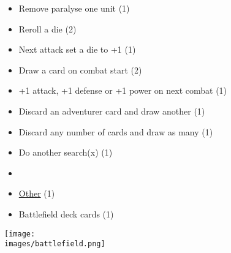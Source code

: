 \begin{multicols}{3}
\begin{itemize}[leftmargin=0pt, label={}, noitemsep, noitemsep]
  \item Remove paralyse one unit (1)
  \item Reroll a die (2)
  \item Next attack set a die to +1 (1)
  \item Draw a card on combat start (2)
  \item +1 attack, +1 defense or +1 power on next combat (1)
  \item Discard an adventurer card and draw another (1)
  \item Discard any number of cards and draw as many (1)
  \item Do another search(x) (1)
  \item
  \item \underline{Other} (1)
  \item Battlefield deck cards (1)
\end{itemize}

\end{multicols}

\vfill
\begin{center}
  \texttt{[image: \\images/battlefield.png]}
\end{center}
